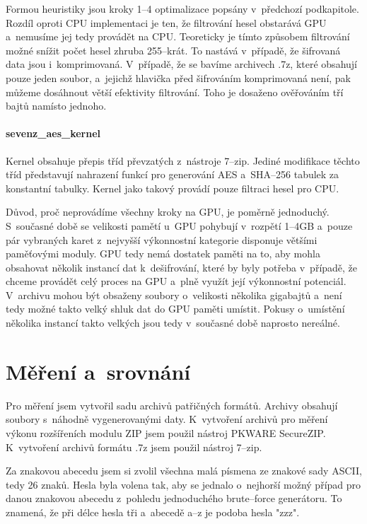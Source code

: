 Formou heuristiky jsou kroky 1--4 optimalizace popsány v~předchozí podkapitole. Rozdíl oproti
CPU implementaci je ten, že filtrování hesel obstarává GPU a~nemusíme jej tedy provádět na CPU.
Teoreticky je tímto způsobem filtrování možné snížit počet hesel zhruba 255--krát. To nastává
v~případě, že šifrovaná data jsou i~komprimovaná. V~případě, že se bavíme archivech .7z, které
obsahují pouze jeden soubor, a~jejichž hlavička před šifrováním komprimovaná není, pak můžeme
dosáhnout větší efektivity filtrování. Toho je dosaženo ověřováním tří bajtů namísto jednoho.

\subsubsection{sevenz\_aes\_kernel}
Kernel obsahuje přepis tříd převzatých z~nástroje 7--zip. Jediné modifikace těchto tříd představují
nahrazení funkcí pro generování AES a~SHA--256 tabulek za konstantní tabulky. Kernel jako
takový provádí pouze filtraci hesel pro CPU. 

Důvod, proč neprovádíme všechny kroky na GPU, je poměrně jednoduchý. S~současné době se velikosti
pamětí u~GPU pohybují v~rozpětí 1--4GB a~pouze pár vybraných karet z~nejvyšší výkonnostní kategorie
disponuje většími paměťovými moduly. GPU tedy nemá dostatek paměti na to, aby mohla obsahovat
několik instancí dat k~dešifrování, které by byly potřeba v~případě, že chceme provádět celý proces na
GPU a~plně využít její výkonnostní potenciál. V~archivu mohou být obsaženy soubory
o~velikosti několika gigabajtů a~není tedy možné takto velký shluk dat do GPU paměti umístit. Pokusy
o~umístění několika instancí takto velkých jsou tedy v~současné době naprosto nereálné. 

\chapter{Měření a~srovnání}
\label{ch:mereni_a_srovnani}
Pro měření jsem vytvořil sadu archivů patřičných formátů. Archivy obsahují soubory s~náhodně
vygenerovanými daty. K~vytvoření archivů pro měření výkonu rozšířeních modulu ZIP jsem použil
nástroj PKWARE SecureZIP. K~vytvoření archivů formátu .7z jsem použil nástroj 7--zip.

Za znakovou abecedu jsem si zvolil všechna malá písmena ze znakové sady ASCII, tedy 26 znaků.
Hesla byla volena tak, aby se jednalo o~nejhorší možný případ pro danou znakovou abecedu z~pohledu
jednoduchého brute--force generátoru. To znamená, že při délce hesla tři a~abecedě a--z je podoba
hesla "zzz".

